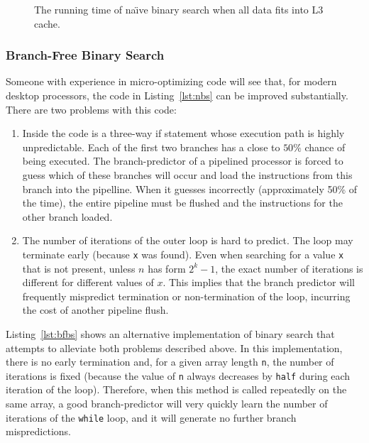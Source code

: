 \documentclass{patmorin}
\newcommand{\lstref}[1]{Listing~\ref{lst:#1}}
\newcommand{\Lstref}[1]{\lstref{#1}}
\begin{document}
\begin{figure}
   \caption{The running time of na\"{\i}ve binary search when all data
    fits into L3 cache.}
\end{figure}


\subsubsection{Branch-Free Binary Search}

Someone with experience in micro-optimizing code will see that, for
modern desktop processors, the code in \lstref{nbs} can be improved
substantially.  There are two problems with this code:

\begin{enumerate}

\item Inside the code is a three-way if statement whose execution path
is highly unpredictable. Each of the first two branches has a close to
$50\%$ chance of being executed.  The branch-predictor of a pipelined
processor is forced to guess which of these branches will occur and load
the instructions from this branch into the pipelline.  When it guesses
incorrectly (approximately 50\% of the time), the entire pipeline must be
flushed and the instructions for the other branch loaded.

\item The number of iterations of the outer loop is hard to predict. The
loop may terminate early (because \texttt{x} was found). Even when
searching for a value \texttt{x} that is not present, unless $n$ has
form $2^k-1$, the exact number of iterations is different for different
values of $x$.  This implies that the branch predictor will frequently
mispredict termination or non-termination of the loop, incurring the
cost of another pipeline flush.

\end{enumerate}

\Lstref{bfbs} shows an alternative implementation of binary search
that attempts to alleviate both problems described above.  In this
implementation, there is no early termination and, for a given array
length \texttt{n}, the number of iterations is fixed (because the
value of \texttt{n} always decreases by \texttt{half}
during each iteration of the loop).  Therefore, when this method is
called repeatedly on the same array, a good branch-predictor will very
quickly learn the number of iterations of the \texttt{while}
loop, and it will generate no further branch mispredictions.
\end{document}
